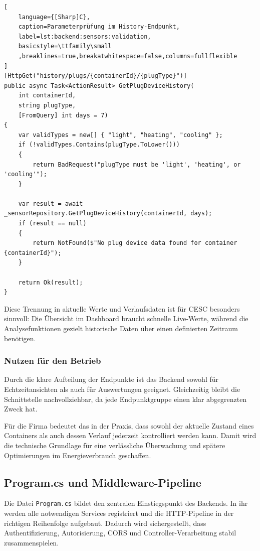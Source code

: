 \begin{lstlisting}[
    language={[Sharp]C},
    caption=Parameterprüfung im History-Endpunkt,
    label=lst:backend:sensors:validation,
    basicstyle=\ttfamily\small
    ,breaklines=true,breakatwhitespace=false,columns=fullflexible
]
[HttpGet("history/plugs/{containerId}/{plugType}")]
public async Task<ActionResult> GetPlugDeviceHistory(
    int containerId,
    string plugType,
    [FromQuery] int days = 7)
{
    var validTypes = new[] { "light", "heating", "cooling" };
    if (!validTypes.Contains(plugType.ToLower()))
    {
        return BadRequest("plugType must be 'light', 'heating', or 'cooling'");
    }

    var result = await _sensorRepository.GetPlugDeviceHistory(containerId, days);
    if (result == null)
    {
        return NotFound($"No plug device data found for container {containerId}");
    }

    return Ok(result);
}
\end{lstlisting}

Diese Trennung in aktuelle Werte und Verlaufsdaten ist für CESC besonders sinnvoll: Die Übersicht im Dashboard braucht schnelle Live-Werte, während die Analysefunktionen gezielt historische Daten über einen definierten Zeitraum benötigen.

\subsubsection{Nutzen für den Betrieb}

Durch die klare Aufteilung der Endpunkte ist das Backend sowohl für Echtzeitansichten als auch für Auswertungen geeignet. Gleichzeitig bleibt die Schnittstelle nachvollziehbar, da jede Endpunktgruppe einen klar abgegrenzten Zweck hat.

Für die Firma bedeutet das in der Praxis, dass sowohl der aktuelle Zustand eines Containers als auch dessen Verlauf jederzeit kontrolliert werden kann. Damit wird die technische Grundlage für eine verlässliche Überwachung und spätere Optimierungen im Energieverbrauch geschaffen.


\subsection{Program.cs und Middleware-Pipeline}

Die Datei \texttt{Program.cs} bildet den zentralen Einstiegspunkt des Backends. In ihr werden alle notwendigen Services registriert und die HTTP-Pipeline in der richtigen Reihenfolge aufgebaut. Dadurch wird sichergestellt, dass Authentifizierung, Autorisierung, CORS und Controller-Verarbeitung stabil zusammenspielen.

